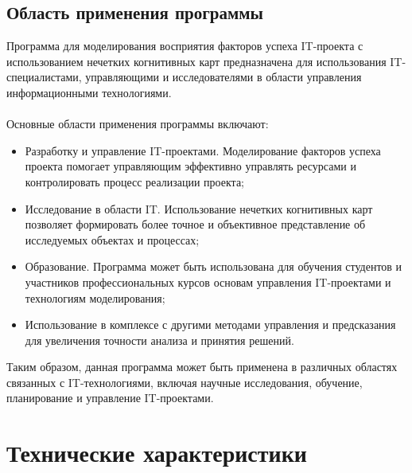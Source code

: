 \documentclass{article}
\begin{document}
    \subsection {Область применения программы}
    Программа для моделирования восприятия факторов успеха IT-проекта с использованием нечетких когнитивных карт предназначена для использования IT-специалистами, управляющими и исследователями в области управления информационными технологиями.\\
    ~\\
    Основные области применения программы включают:
    \begin{itemize}
        \item Разработку и управление IT-проектами. Моделирование факторов успеха проекта помогает управляющим эффективно управлять ресурсами и контролировать процесс реализации проекта;
        \item Исследование в области IT. Использование нечетких когнитивных карт позволяет формировать более точное и объективное представление об исследуемых объектах и процессах;
        \item Образование. Программа может быть использована для обучения студентов и участников профессиональных курсов основам управления IT-проектами и технологиям моделирования;
        \item Использование в комплексе с другими методами управления и предсказания для увеличения точности анализа и принятия решений.
    \end{itemize}
    Таким образом, данная программа может быть применена в различных областях связанных с IT-технологиями, включая научные исследования, обучение, планирование и управление IT-проектами.
    \newpage
    \section {Технические характеристики}
\end{document}
